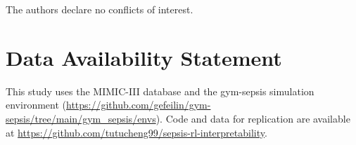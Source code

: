 \documentclass[11pt]{article}
\begin{document}
The authors declare no conflicts of interest.

\section{Data Availability Statement}

This study uses the MIMIC-III database \citep{johnson2016mimic3} and the gym-sepsis simulation environment (\url{https://github.com/gefeilin/gym-sepsis/tree/main/gym_sepsis/envs}). Code and data for replication are available at \url{https://github.com/tutucheng99/sepsis-rl-interpretability}.




\end{document}
